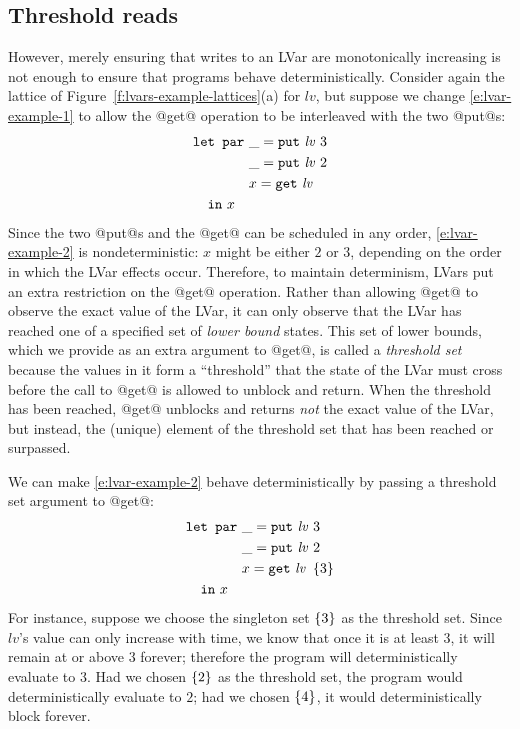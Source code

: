 \subsection{Threshold reads}

However, merely ensuring that writes to an LVar are monotonically
increasing is not enough to ensure that programs behave
deterministically.  Consider again the lattice of
Figure~\ref{f:lvars-example-lattices}(a) for $\mathit{lv}$, but
suppose we change \ref{e:lvar-example-1} to allow the @get@ operation
to be interleaved with the two @put@s:
\begin{equation}
\begin{split}
& \LETPAR ~\_ = \putexp{\mathit{lv}}{3} \\
&  \letparspace ~\_ = \putexp{\mathit{lv}}{2} \\
&  \letparspace ~x = \GET~\mathit{lv} \\
&  \letspace \IN~x
\end{split}
\label{e:lvar-example-2}
\end{equation}
Since the two @put@s and the @get@ can be scheduled in any order,
\ref{e:lvar-example-2} is nondeterministic: $x$ might be either $2$ or
$3$, depending on the order in which the LVar effects occur.
Therefore, to maintain determinism, LVars put an extra restriction on
the @get@ operation.  Rather than allowing @get@ to observe the exact
value of the LVar, it can only observe that the LVar has reached one
of a specified set of \emph{lower bound} states.  This set of lower
bounds, which we provide as an extra argument to @get@, is called a
\emph{threshold set} because the values in it form a ``threshold''
that the state of the LVar must cross before the call to @get@ is
allowed to unblock and return.  When the threshold has been reached,
@get@ unblocks and returns \emph{not} the exact value of the LVar, but
instead, the (unique) element of the threshold set that has been
reached or surpassed.

We can make \ref{e:lvar-example-2} behave deterministically by passing
a threshold set argument to @get@:
\begin{equation}
\begin{split}
& \LETPAR ~\_ = \putexp{\mathit{lv}}{3} \\
&  \letparspace ~\_ = \putexp{\mathit{lv}}{2} \\
&  \letparspace ~x = \getexp{\mathit{lv}}{\setof{3}} \\
&  \letspace \IN~x
\end{split}
\label{e:lvar-example-3}
\end{equation}
For instance, suppose we choose the singleton set $\left\{3\right\}$ as the
threshold set.  Since $\mathit{lv}$'s value can only increase with
time, we know that once it is at least $3$, it will remain at or above
$3$ forever; therefore the program will deterministically evaluate to
$3$.  Had we chosen $\left\{2\right\}$ as the threshold set, the program
would deterministically evaluate to $2$; had we chosen $\left\{4\right\}$, it
would deterministically block forever.

